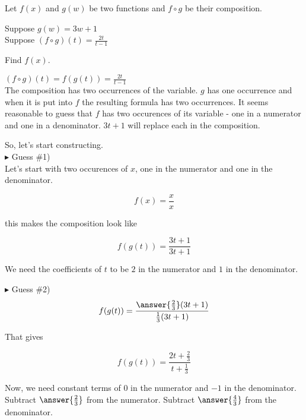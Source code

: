 \documentclass{ximera}
\begin{document}
\begin{example}


Let $f(x)$ and $g(w)$ be two functions and $f \circ g$ be their composition.


Suppose $g(w) = 3w + 1$ \\

Suppose $(f \circ g)(t) = \frac{2t}{t-1}$


Find $f(x)$.



\begin{explanation}




$(f \circ g)(t) =  f(g(t)) =  \frac{2t}{t-1}$ \\



The composition has two occurrences of the variable.  $g$ has one occurrence and when it is put into $f$ the resulting formula has two occurrences.  It seems reasonable to guess that $f$ has two occurences of its variable - one in a numerator and one in a denominator.  $3t + 1$ will replace each in the composition.

So, let's start constructing. \\


$\blacktriangleright$  Guess \#1) \\

Let's start with two occurences of $x$, one in the numerator and one in the denominator.

\[      f(x) = \frac{x}{x}       \]


this makes the composition look like

\[   f(g(t)) =      \frac{3t + 1}{3t + 1}       \]



We need the coefficients of $t$ to be $2$ in the numerator and $1$ in the denominator.

$\blacktriangleright$  Guess \#2) \\

\[   f(g(t)) =      \frac{\answer{\frac{2}{3}}(3t + 1)}{\frac{1}{3}(3t + 1)}       \]

That gives


\[   f(g(t)) =      \frac{2t + \frac{2}{3}}{t + \frac{1}{3}}       \]



Now, we need constant terms of $0$ in the numerator and $-1$ in the denominator.  Subtract $\answer{\frac{2}{3}}$ from the numerator. Subtract $\answer{\frac{4}{3}}$ from the denominator. \\


\end{explanation}
\end{example}
\end{document}
